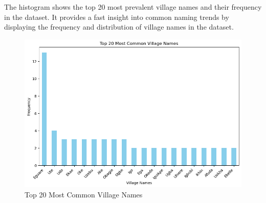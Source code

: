 The histogram shows the top 20 most prevalent village names and their frequency in the dataset. It provides a fast insight into common naming trends by displaying the frequency and distribution of village names in the dataset.

\begin{figure}
    \centering
    \includegraphics[width=1\linewidth]{histogram2.png}
    \caption{Top 20 Most Common Village Names}
    \label{fig:histogram2}
\end{figure}
\newpage

